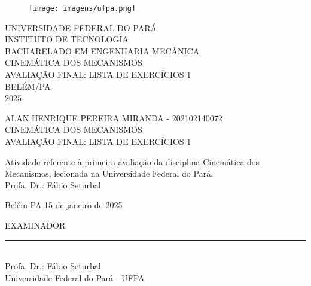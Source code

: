 \thispagestyle{empty}

\begin{center}
	\begin{figure}[h]
  \centering
		\texttt{[image: imagens/ufpa.png]}
		\label{fig:ufpa}
	\end{figure}
	
	
	\vspace{1cm}
	\large \uppercase{UNIVERSIDADE FEDERAL DO PARÁ}\\
	\large \uppercase{INSTITUTO DE TECNOLOGIA}\\
	\large \uppercase{BACHARELADO EM ENGENHARIA MECÂNICA}\\
	\vspace{6cm}
	\large \uppercase{CINEMÁTICA DOS MECANISMOS}\\
	\vspace{1cm}
	\large \uppercase {AVALIAÇÃO FINAL: LISTA DE EXERCÍCIOS 1} \\
	\vspace{7cm}
	\large {BELÉM/PA \\ 2025}

 \newpage
 \thispagestyle{empty}
 \large \uppercase{alan henrique pereira miranda - 202102140072}\\
 \vspace{5cm}
	\large \uppercase{CINEMÁTICA DOS MECANISMOS}\\
\vspace{1cm}
	\large \uppercase {AVALIAÇÃO FINAL: LISTA DE EXERCÍCIOS 1} \\
 \vspace{1cm}
 \singlespacing
 \hspace{8cm} %
 \begin{minipage}{7cm}
	Atividade referente à primeira avaliação da disciplina Cinemática dos Mecanismos, lecionada na Universidade Federal do Pará. \\
	
	Profa. Dr.: Fábio Seturbal
	\vspace{1cm}
	
	Belém-PA 15 de janeiro de 2025
	\vspace{4cm}
\end{minipage}

\onehalfspacing
\begin{center}
	
	EXAMINADOR\\
	\vspace{3cm}
	\rule{10cm}{0.15mm} \\
	Profa. Dr.: Fábio Seturbal\\
	Universidade Federal do Pará - UFPA
\end{center}
\newpage

\begin{center}
    \thispagestyle{empty}
	\listoffigures
	\newpage
    \thispagestyle{empty}
    \tableofcontents

\end{center}

\newpage
\thispagestyle{empty}
	
\end{center}